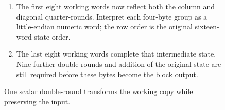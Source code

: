 \begin{figure}[htbp]
\begin{minipage}{\linewidth}
\begin{enumerate}
      \item The first eight working words now reflect both the column and diagonal quarter-rounds. Interpret each four-byte group as a little-endian numeric word; the row order is the original sixteen-word state order.
      \item The last eight working words complete that intermediate state. Nine further double-rounds and addition of the original state are still required before these bytes become the block output.
    \end{enumerate}
  \end{minipage}
  \caption{One scalar double-round transforms the working copy while preserving the input.}
  \label{capture:026-chacha20-f02}
  \label{chacha-f02}
\end{figure}
\par
